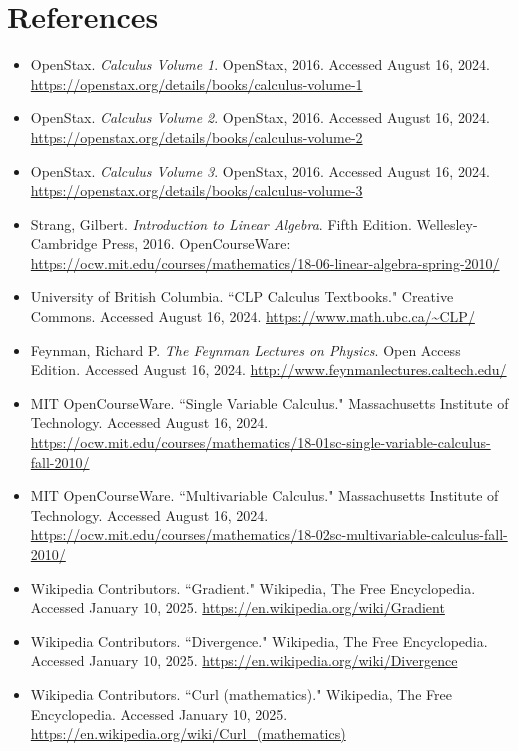 
\chapter*{References}


\begin{itemize}
    \item OpenStax. \textit{Calculus Volume 1}. OpenStax, 2016. Accessed August 16, 2024. \url{https://openstax.org/details/books/calculus-volume-1}
    \item OpenStax. \textit{Calculus Volume 2}. OpenStax, 2016. Accessed August 16, 2024. \url{https://openstax.org/details/books/calculus-volume-2}
    \item OpenStax. \textit{Calculus Volume 3}. OpenStax, 2016. Accessed August 16, 2024. \url{https://openstax.org/details/books/calculus-volume-3}
    \item Strang, Gilbert. \textit{Introduction to Linear Algebra}. Fifth Edition. Wellesley-Cambridge Press, 2016. OpenCourseWare: \url{https://ocw.mit.edu/courses/mathematics/18-06-linear-algebra-spring-2010/}
    \item University of British Columbia. ``CLP Calculus Textbooks." Creative Commons. Accessed August 16, 2024. \url{https://www.math.ubc.ca/~CLP/}
    \item Feynman, Richard P. \textit{The Feynman Lectures on Physics}. Open Access Edition. Accessed August 16, 2024. \url{http://www.feynmanlectures.caltech.edu/}
    \item MIT OpenCourseWare. ``Single Variable Calculus." Massachusetts Institute of Technology. Accessed August 16, 2024. \url{https://ocw.mit.edu/courses/mathematics/18-01sc-single-variable-calculus-fall-2010/}
    \item MIT OpenCourseWare. ``Multivariable Calculus." Massachusetts Institute of Technology. Accessed August 16, 2024. \url{https://ocw.mit.edu/courses/mathematics/18-02sc-multivariable-calculus-fall-2010/}
    \item Wikipedia Contributors. ``Gradient." Wikipedia, The Free Encyclopedia. Accessed January 10, 2025. \url{https://en.wikipedia.org/wiki/Gradient}
    \item Wikipedia Contributors. ``Divergence." Wikipedia, The Free Encyclopedia. Accessed January 10, 2025. \url{https://en.wikipedia.org/wiki/Divergence}
    \item Wikipedia Contributors. ``Curl (mathematics)." Wikipedia, The Free Encyclopedia. Accessed January 10, 2025. \url{https://en.wikipedia.org/wiki/Curl_(mathematics)}

\end{itemize}
